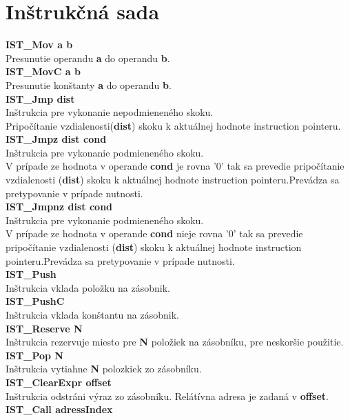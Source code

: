 \documentclass[12pt,a4paper,titlepage,final]{article}
\begin{document}
\section{Inštrukčná sada}

\textbf{IST\_Mov a b}\\
Presunutie operandu \textbf{a} do operandu \textbf{b}. \\
\textbf{IST\_MovC a b} \\
Presunutie konštanty \textbf{a} do operandu \textbf{b}. \\
\textbf{IST\_Jmp dist}\\
Inštrukcia pre vykonanie nepodmieneného skoku.\\
Pripočítanie vzdialenosti(\textbf{dist}) skoku k aktuálnej hodnote instruction
pointeru.\\
\textbf{IST\_Jmpz dist cond}\\
Inštrukcia pre vykonanie podmieneného skoku.\\
V prípade ze hodnota v operande \textbf{cond} je rovna '0' tak sa prevedie
pripočítanie vzdialenosti (\textbf{dist}) skoku k aktuálnej hodnote instruction
pointeru.Prevádza sa pretypovanie v prípade nutnosti.\\
\textbf{IST\_Jmpnz dist cond}\\
Inštrukcia pre vykonanie podmieneného skoku.\\
V prípade ze hodnota v operande \textbf{cond} nieje rovna '0' tak sa prevedie
pripočítanie vzdialenosti (\textbf{dist}) skoku k aktuálnej hodnote instruction
pointeru.Prevádza sa pretypovanie v prípade nutnosti.\\
\textbf{IST\_Push}\\
Inštrukcia vklada položku na zásobnik.\\
\textbf{IST\_PushC}\\
Inštrukcia vklada konštantu na zásobnik.\\
\textbf{IST\_Reserve N}\\
Inštrukcia rezervuje miesto pre \textbf{N} položiek na zásobníku, pre neskoršie
 použitie.\\
\textbf{IST\_Pop N}\\
Inštrukcia vytiahne \textbf{N} polozkiek zo zásobníku.\\
\textbf{IST\_ClearExpr offset} \\
Inštrukcia odstráni výraz zo zásobníku. Relátívna adresa je zadaná v \textbf{offset}.\\
\textbf{IST\_Call adressIndex}\\
\end{document}
